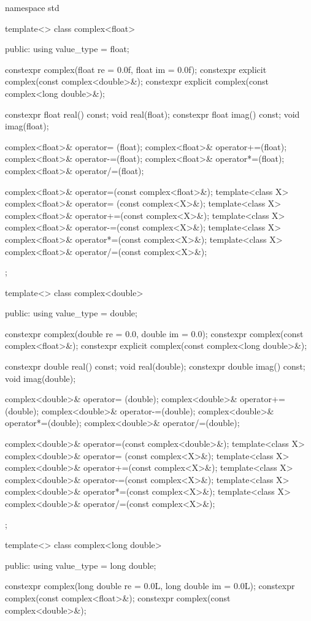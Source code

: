 \begin{codeblock}
namespace std {
  template<> class complex<float> {
  public:
    using value_type = float;

    constexpr complex(float re = 0.0f, float im = 0.0f);
    constexpr explicit complex(const complex<double>&);
    constexpr explicit complex(const complex<long double>&);

    constexpr float real() const;
    void real(float);
    constexpr float imag() const;
    void imag(float);

    complex<float>& operator= (float);
    complex<float>& operator+=(float);
    complex<float>& operator-=(float);
    complex<float>& operator*=(float);
    complex<float>& operator/=(float);

    complex<float>& operator=(const complex<float>&);
    template<class X> complex<float>& operator= (const complex<X>&);
    template<class X> complex<float>& operator+=(const complex<X>&);
    template<class X> complex<float>& operator-=(const complex<X>&);
    template<class X> complex<float>& operator*=(const complex<X>&);
    template<class X> complex<float>& operator/=(const complex<X>&);
  };

  template<> class complex<double> {
  public:
    using value_type = double;

    constexpr complex(double re = 0.0, double im = 0.0);
    constexpr complex(const complex<float>&);
    constexpr explicit complex(const complex<long double>&);

    constexpr double real() const;
    void real(double);
    constexpr double imag() const;
    void imag(double);

    complex<double>& operator= (double);
    complex<double>& operator+=(double);
    complex<double>& operator-=(double);
    complex<double>& operator*=(double);
    complex<double>& operator/=(double);

    complex<double>& operator=(const complex<double>&);
    template<class X> complex<double>& operator= (const complex<X>&);
    template<class X> complex<double>& operator+=(const complex<X>&);
    template<class X> complex<double>& operator-=(const complex<X>&);
    template<class X> complex<double>& operator*=(const complex<X>&);
    template<class X> complex<double>& operator/=(const complex<X>&);
  };

  template<> class complex<long double> {
  public:
    using value_type = long double;

    constexpr complex(long double re = 0.0L, long double im = 0.0L);
    constexpr complex(const complex<float>&);
    constexpr complex(const complex<double>&);

}}
\end{codeblock}
